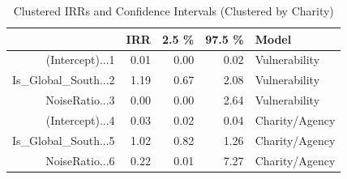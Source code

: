 \begin{table}[ht]
\centering
\begin{tabular}{rrrrl}
  \hline
 & IRR & 2.5 \% & 97.5 \% & Model \\ 
  \hline
(Intercept)...1 & 0.01 & 0.00 & 0.02 & Vulnerability \\ 
  Is\_Global\_South...2 & 1.19 & 0.67 & 2.08 & Vulnerability \\ 
  NoiseRatio...3 & 0.00 & 0.00 & 2.64 & Vulnerability \\ 
  (Intercept)...4 & 0.03 & 0.02 & 0.04 & Charity/Agency \\ 
  Is\_Global\_South...5 & 1.02 & 0.82 & 1.26 & Charity/Agency \\ 
  NoiseRatio...6 & 0.22 & 0.01 & 7.27 & Charity/Agency \\ 
   \hline
\end{tabular}
\caption{Clustered IRRs and Confidence Intervals (Clustered by Charity)} 
\end{table}

